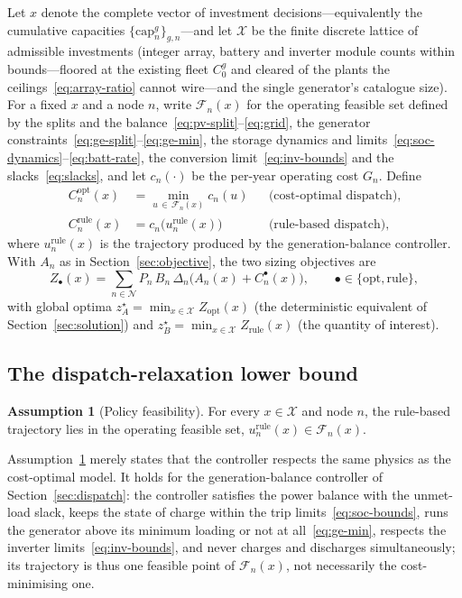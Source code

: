 \documentclass[11pt,a4paper]{article}
\theoremstyle{plain}
\theoremstyle{definition}
\newtheorem{assumption}{Assumption}
\begin{document}
Let $x$ denote the complete vector of investment decisions---equivalently the cumulative
capacities $\{\mathrm{cap}^{g}_n\}_{g,n}$---and let $\mathcal{X}$ be the finite discrete
lattice of admissible investments (integer array, battery and inverter module counts within
bounds---floored at the existing fleet $C^{g}_0$ and cleared of the plants the
ceilings~\eqref{eq:array-ratio} cannot wire---and the single generator's catalogue size).
For a fixed $x$ and a node $n$, write $\mathcal{F}_n(x)$ for the operating feasible set
defined by the splits and the balance~\eqref{eq:pv-split}--\eqref{eq:grid}, the generator
constraints~\eqref{eq:ge-split}--\eqref{eq:ge-min}, the storage
dynamics and limits~\eqref{eq:soc-dynamics}--\eqref{eq:batt-rate}, the conversion
limit~\eqref{eq:inv-bounds} and the slacks~\eqref{eq:slacks}, and let $c_n(\cdot)$ be the
per-year operating cost $G_n$. Define
\begin{align}
  C^{\mathrm{opt}}_n(x) &= \min_{u\,\in\,\mathcal{F}_n(x)} c_n(u)
      && \text{(cost-optimal dispatch),}\\
  C^{\mathrm{rule}}_n(x) &= c_n\big(u^{\mathrm{rule}}_n(x)\big)
      && \text{(rule-based dispatch),}
\end{align}
where $u^{\mathrm{rule}}_n(x)$ is the trajectory produced by the generation-balance
controller. With $A_n$ as in Section~\ref{sec:objective}, the two sizing objectives are
\begin{equation}
  Z_\bullet(x) = \sum_{n\in\mathcal{N}} P_n\,B_n\,\Delta_n
  \big( A_n(x) + C^{\bullet}_n(x) \big),
  \qquad \bullet\in\{\mathrm{opt},\mathrm{rule}\},
\end{equation}
with global optima $z_A^\star=\min_{x\in\mathcal{X}} Z_{\mathrm{opt}}(x)$ (the
deterministic equivalent of Section~\ref{sec:solution}) and
$z_B^\star=\min_{x\in\mathcal{X}} Z_{\mathrm{rule}}(x)$ (the quantity of interest).

\subsection{The dispatch-relaxation lower bound}

\begin{assumption}[Policy feasibility]
\label{ass:feas}
For every $x\in\mathcal{X}$ and node $n$, the rule-based trajectory lies in the operating
feasible set, $u^{\mathrm{rule}}_n(x)\in\mathcal{F}_n(x)$.
\end{assumption}

Assumption~\ref{ass:feas} merely states that the controller respects the same physics as
the cost-optimal model. It holds for the generation-balance controller of
Section~\ref{sec:dispatch}: the controller satisfies the power balance with the unmet-load
slack, keeps the state of charge within the trip limits~\eqref{eq:soc-bounds}, runs the
generator above its minimum loading or not at all~\eqref{eq:ge-min}, respects the inverter
limits~\eqref{eq:inv-bounds}, and never charges and discharges simultaneously; its
trajectory is thus one feasible point of $\mathcal{F}_n(x)$, not necessarily the
cost-minimising one.
\end{document}
